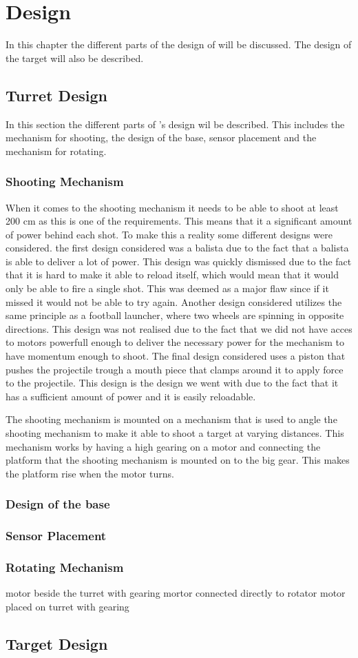 \chapter{Design}
In this chapter the different parts of the design of \name will be discussed.
The design of the target will also be described.

\section{Turret Design}
In this section the different parts of \namep's design wil be described. This
includes the mechanism for shooting, the design of the base, sensor placement
and the mechanism for rotating.

\subsection{Shooting Mechanism}
When it comes to the shooting mechanism it needs to be able to shoot at least
200 cm as this is one of the requirements. This means that it a significant
amount of power behind each shot. To make this a reality some different designs
were considered. the first design considered was a balista due to the fact that
a balista is able to deliver a lot of power. This design was quickly dismissed
due to the fact that it is hard to make it able to reload itself, which would
mean that it would only be able to fire a single shot. This was deemed as a
major flaw since if it missed it would not be able to try again. Another design
considered utilizes the same principle as a football launcher, where two wheels
are spinning in opposite directions. This design was not realised due to the
fact that we did not have acces to motors powerfull enough to deliver the
necessary power for the mechanism to have momentum enough to shoot. The final
design considered uses a piston that pushes the projectile trough a mouth piece
that clamps around it to apply force to the projectile. This design is the
design we went with due to the fact that it has a sufficient amount of power and
it is easily reloadable.\nl

The shooting mechanism is mounted on a mechanism that is used to angle the
shooting mechanism to make it able to shoot a target at varying distances. This
mechanism works by having a high gearing on a motor and connecting the platform
that the shooting mechanism is mounted on to the big gear. This makes the
platform rise when the motor turns.

\subsection{Design of the base}

\subsection{Sensor Placement}

\subsection{Rotating Mechanism}
motor beside the turret with gearing
mortor connected directly to rotator
motor placed on turret with gearing

\section{Target Design}

